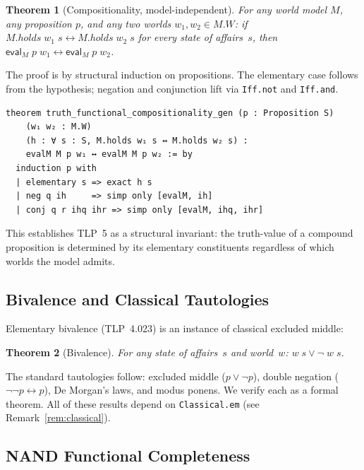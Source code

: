 \documentclass[10pt, letterpaper]{article}
\newtheorem{theorem}{Theorem}[section]
\theoremstyle{definition}
\theoremstyle{remark}
\newcommand{\eval}{\mathsf{eval}}
\begin{document}
\begin{theorem}[Compositionality, model-independent]
\label{thm:compositionality}
For any world model $M$, any proposition $p$, and any two
worlds $w_1, w_2 \in M.W$: if $M.\mathit{holds}\;w_1\;s
\leftrightarrow M.\mathit{holds}\;w_2\;s$ for every state of
affairs~$s$, then $\eval_M\;p\;w_1 \leftrightarrow
\eval_M\;p\;w_2$.
\end{theorem}

\noindent
The proof is by structural induction on propositions.
The elementary case follows from the hypothesis; negation and
conjunction lift via \texttt{Iff.not} and \texttt{Iff.and}.

\begin{lstlisting}
theorem truth_functional_compositionality_gen (p : Proposition S)
    (w₁ w₂ : M.W)
    (h : ∀ s : S, M.holds w₁ s ↔ M.holds w₂ s) :
    evalM M p w₁ ↔ evalM M p w₂ := by
  induction p with
  | elementary s => exact h s
  | neg q ih     => simp only [evalM, ih]
  | conj q r ihq ihr => simp only [evalM, ihq, ihr]
\end{lstlisting}

\noindent
This establishes TLP~5 as a structural invariant: the
truth-value of a compound proposition is determined by its
elementary constituents regardless of which worlds the model
admits.

\subsection{Bivalence and Classical Tautologies}
\label{sec:bivalence}

Elementary bivalence (TLP~4.023) is an instance of classical
excluded middle:

\begin{theorem}[Bivalence]
For any state of affairs~$s$ and world~$w$: $w\;s \lor \lnot\;w\;s$.
\end{theorem}

\noindent
The standard tautologies follow: excluded middle ($p \lor
\lnot p$), double negation ($\lnot\lnot p \leftrightarrow p$),
De Morgan's laws, and modus ponens.  We verify each as a formal
theorem.  All of these results depend on \texttt{Classical.em}
(see Remark~\ref{rem:classical}).

\subsection{NAND Functional Completeness}
\label{sec:nand}
\end{document}
